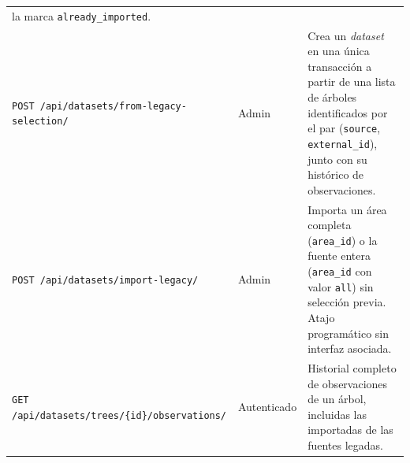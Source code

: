 \begin{table}[H]
\begin{tabularx}{\textwidth}{@{}p{5.5cm} p{1.9cm} X@{}}
      la marca \texttt{already\_imported}. \\
    \texttt{POST \slash api\slash datasets\slash from-legacy-selection\slash } &
      Admin &
      Crea un \textit{dataset} en una única transacción a partir de una lista de árboles
      identificados por el par (\texttt{source}, \texttt{external\_id}), junto con su histórico
      de observaciones. \\
    \texttt{POST \slash api\slash datasets\slash import-legacy\slash } &
      Admin &
      Importa un área completa (\texttt{area\_id}) o la fuente entera (\texttt{area\_id} con
      valor \texttt{all}) sin selección previa. Atajo programático sin interfaz asociada. \\
    \texttt{GET \slash api\slash datasets\slash trees\slash \{id\}\slash observations\slash } &
      Autenticado &
      Historial completo de observaciones de un árbol, incluidas las importadas de las fuentes
      legadas. \\
    \bottomrule
  \end{tabularx}
\end{table}

